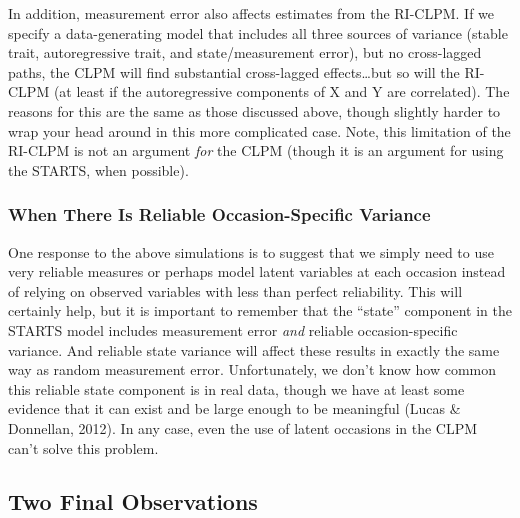 \documentclass[
  english,
  man,floatsintext]{apa6}
\begin{document}
In addition, measurement error also affects estimates from the RI-CLPM. If we specify a data-generating model that includes all three sources of variance (stable trait, autoregressive trait, and state/measurement error), but no cross-lagged paths, the CLPM will find substantial cross-lagged effects\ldots but so will the RI-CLPM (at least if the autoregressive components of X and Y are correlated). The reasons for this are the same as those discussed above, though slightly harder to wrap your head around in this more complicated case. Note, this limitation of the RI-CLPM is not an argument \emph{for} the CLPM (though it is an argument for using the STARTS, when possible).

\hypertarget{when-there-is-reliable-occasion-specific-variance}{%
\subsubsection{When There Is Reliable Occasion-Specific Variance}\label{when-there-is-reliable-occasion-specific-variance}}

One response to the above simulations is to suggest that we simply need to use very reliable measures or perhaps model latent variables at each occasion instead of relying on observed variables with less than perfect reliability. This will certainly help, but it is important to remember that the ``state'' component in the STARTS model includes measurement error \emph{and} reliable occasion-specific variance. And reliable state variance will affect these results in exactly the same way as random measurement error. Unfortunately, we don't know how common this reliable state component is in real data, though we have at least some evidence that it can exist and be large enough to be meaningful (Lucas \& Donnellan, 2012). In any case, even the use of latent occasions in the CLPM can't solve this problem.

\hypertarget{two-final-observations}{%
\subsection{Two Final Observations}\label{two-final-observations}}
\end{document}
